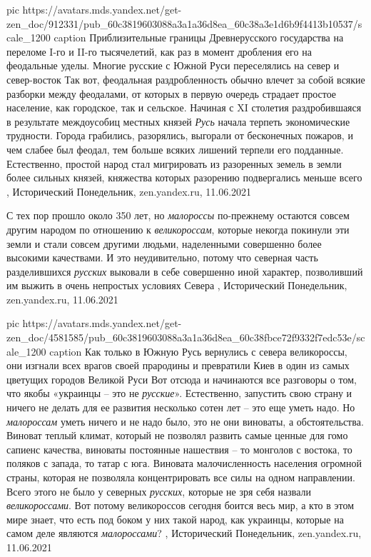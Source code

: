 \ifcmt
  pic https://avatars.mds.yandex.net/get-zen_doc/912331/pub_60c3819603088a3a1a36d8ea_60c38a3e1d6b9f4413b10537/scale_1200
	caption Приблизительные границы Древнерусского государства на переломе I-го и II-го тысячелетий, как раз в момент дробления его на феодальные уделы. Многие русские с Южной Руси переселялись на север и север-восток
\fi
Так вот, феодальная раздробленность обычно влечет за собой всякие разборки
между феодалами, от которых в первую очередь страдает простое население, как
городское, так и сельское. Начиная с XI столетия раздробившаяся в результате
междоусобиц местных князей \emph{Русь} начала терпеть экономические трудности. Города
грабились, разорялись, выгорали от бесконечных пожаров, и чем слабее был
феодал, тем больше всяких лишений терпели его подданные. Естественно, простой
народ стал мигрировать из разоренных земель в земли более сильных князей,
княжества которых разорению подвергались меньше всего
, 
Исторический Понедельник, zen.yandex.ru, 11.06.2021

С тех пор прошло около 350 лет, но \emph{малороссы} по-прежнему остаются совсем другим
народом по отношению к \emph{великороссам}, которые некогда покинули эти земли и стали
совсем другими людьми, наделенными совершенно более высокими качествами. И это
неудивительно, потому что северная часть разделившихся \emph{русских} выковали в себе
совершенно иной характер, позволивший им выжить в очень непростых условиях
Севера
, 
Исторический Понедельник, zen.yandex.ru, 11.06.2021

\ifcmt
  pic https://avatars.mds.yandex.net/get-zen_doc/4581585/pub_60c3819603088a3a1a36d8ea_60c38fbce72f9332f7edc53e/scale_1200
	caption Как только в Южную Русь вернулись с севера великороссы, они изгнали всех врагов своей прародины и превратили Киев в один из самых цветущих городов Великой Руси
\fi
Вот отсюда и начинаются все разговоры о том, что якобы «украинцы – это не
\emph{русские}». Естественно, запустить свою страну и ничего не делать для ее развития
несколько сотен лет – это еще уметь надо. Но \emph{малороссам} уметь ничего и не надо
было, это не они виноваты, а обстоятельства. Виноват теплый климат, который не
позволял развить самые ценные для гомо сапиенс качества, виноваты постоянные
нашествия – то монголов с востока, то поляков с запада, то татар с юга.
Виновата малочисленность населения огромной страны, которая не позволяла
концентрировать все силы на одном направлении.  Всего этого не было у северных
\emph{русских}, которые не зря себя назвали \emph{великороссами}. Вот потому великороссов
сегодня боится весь мир, а кто в этом мире знает, что есть под боком у них
такой народ, как украинцы, которые на самом деле являются \emph{малороссами}?
, 
Исторический Понедельник, zen.yandex.ru, 11.06.2021

